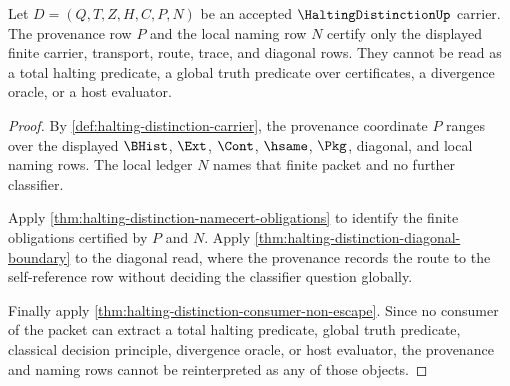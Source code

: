 \begin{theorem}
\label{thm:halting-distinction-provenance-purity-boundary}
Let $D=(Q,T,Z,H,C,P,N)$ be an accepted $\HaltingDistinctionUp$ carrier. The
provenance row $P$ and the local naming row $N$ certify only the displayed
finite carrier, transport, route, trace, and diagonal rows. They cannot be read
as a total halting predicate, a global truth predicate over certificates, a
divergence oracle, or a host evaluator.
\end{theorem}
\begin{proof}
By \autoref{def:halting-distinction-carrier}, the provenance coordinate $P$
ranges over the displayed $\BHist$, $\Ext$, $\Cont$, $\hsame$, $\Pkg$,
diagonal, and local naming rows. The local ledger $N$ names that finite packet
and no further classifier.

Apply \autoref{thm:halting-distinction-namecert-obligations} to identify the
finite obligations certified by $P$ and $N$. Apply
\autoref{thm:halting-distinction-diagonal-boundary} to the diagonal read, where
the provenance records the route to the self-reference row without deciding
the classifier question globally.

Finally apply \autoref{thm:halting-distinction-consumer-non-escape}. Since no
consumer of the packet can extract a total halting predicate, global truth
predicate, classical decision principle, divergence oracle, or host evaluator,
the provenance and naming rows cannot be reinterpreted as any of those objects.
\end{proof}

